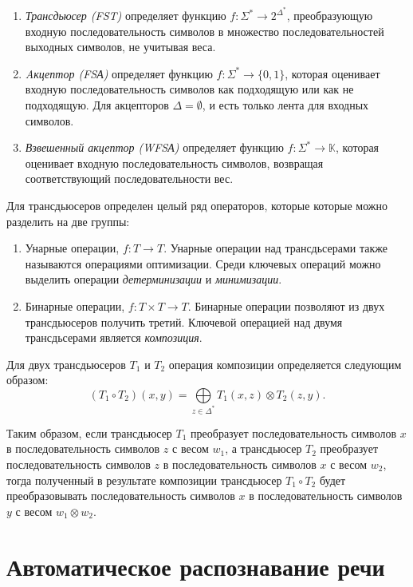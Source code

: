 \begin{enumerate}
  \item \textit{Трансдьюсер (FST)} определяет функцию $f : \Sigma^* \rightarrow 2^{\Delta^*}$, преобразующую входную последовательность символов в множество последовательностей выходных символов, не учитывая веса.
  \item \textit{Aкцептор (FSА)} определяет функцию $f : \Sigma^* \rightarrow \{0, 1\}$, которая оценивает входную последовательность символов как подходящую или как не подходящую. Для акцепторов $\Delta=\emptyset$, и есть только лента для входных символов.
  \item \textit{Взвешенный акцептор (WFSА)} определяет функцию $f : \Sigma^* \rightarrow \mathbb{K}$, которая оценивает входную последовательность символов, возвращая соответствующий последовательности вес.
\end{enumerate}

Для трансдьюсеров определен целый ряд операторов, которые которые можно разделить на две группы:

\begin{enumerate}
  \item Унарные операции, $f : T \rightarrow T$. Унарные операции над трансдьсерами также называются операциями оптимизации. Среди ключевых операций можно выделить операции \textit{детерминизации} и \textit{минимизации}.
  \item Бинарные операции, $f : T \times T \rightarrow T$. Бинарные операции позволяют из двух трансдьюсеров получить третий. Ключевой операцией над двумя трансдьсерами является \textit{композиция}.
\end{enumerate}

Для двух трансдьюсеров $T_1$ и $T_2$ операция композиции определяется следующим образом:
\[
  (T_1 \circ T_2)(x,y)=\bigoplus\limits_{z \in \Delta^*} T_1(x,z) \otimes T_2(z,y).
\]

Таким образом, если трансдьюсер $T_1$ преобразует последовательность символов $x$ в последовательность символов $z$ с весом $w_1$, а трансдьюсер $T_2$ преобразует последовательность символов $z$ в последовательность символов $x$ с весом $w_2$, тогда полученный в результате композиции трансдьюсер $T_1 \circ T_2$ будет преобразовывать последовательность символов $x$ в последовательность символов $y$ с весом $w_1 \otimes w_2$.


\section{Автоматическое распознавание речи}\label{sec:ch1/asr}

